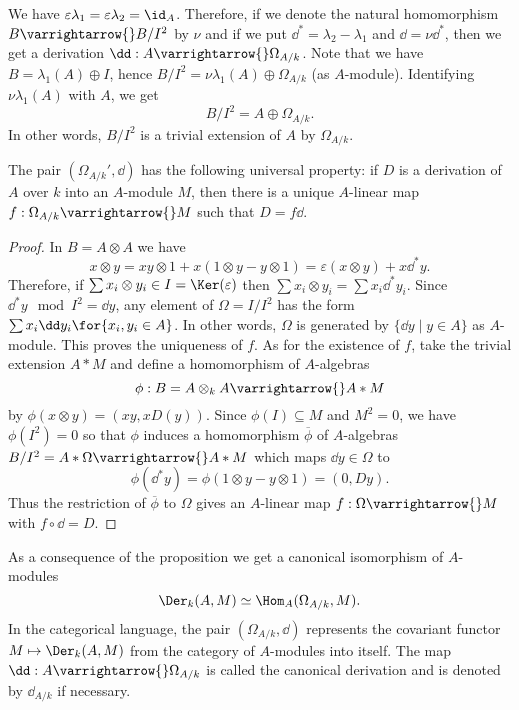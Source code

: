 \documentclass[../main]{subfiles}
\begin{document}
We have $\varepsilon \lambda_1=\varepsilon \lambda_2=\id_A$. Therefore, if we denote the natural homomorphism $B \varrightarrow{} B / I^2$ by $\nu$ and if we put $\dd^\ast=\lambda_2-\lambda_1$ and $\dd=\nu \dd^*$, then we get a derivation $\dd: A \varrightarrow{} \Omega_{A / k}$. Note that we have $B=\lambda_1(A) \oplus I$, hence $B / I^2=\nu \lambda_1(A) \oplus \Omega_{A / k}$ (as $A$-module). Identifying $\nu \lambda_1(A)$ with $A$, we get
\[
B / I^2=A \oplus \Omega_{A/k}.
\]
In other words, $B / I^2$ is a trivial extension of $A$ by $\Omega_{A/k}$.

\begin{proposition}\label{prop:26.01}
The pair $(\Omega_{A/k}', \dd)$ has the following universal property: if $D$ is a derivation of $A$ over $k$ into an $A$-module $M$, then there is a unique $A$-linear map $f: \Omega_{A / k} \varrightarrow{} M$ such that $D=f \dd$.
\end{proposition}
\begin{proof}
In $B=A \otimes A$ we have \[x \otimes y=x y \otimes 1+x(1 \otimes y-y \otimes 1)=\varepsilon(x \otimes y)+x \dd^\ast y.\] Therefore, if $\sum x_i \otimes y_i \in I=\Ker(\varepsilon)$ then $\sum x_i \otimes y_i=\sum x_i \dd^{\ast} y_i$. Since $\dd^\ast y \mod I^2=\dd y$, any element of $\Omega= I/ I^2$ has the form $\sum x_i \dd y_i\for{x_i, y_i\in A}$. In other words, $\Omega$ is generated by $\{\dd y \mid y \in A\}$ as $A$-module. This proves the uniqueness of $f$. As for the existence of $f$, take the trivial extension $A\ast M$ and define a homomorphism of $A$-algebras \[\phi: B=A \otimes_k A \varrightarrow{} A \ast M\] by $\phi(x \otimes y)=(x y, x D(y))$. Since $\phi(I) \subseteq M$ and $M^2=0$, we have $\phi(I^2)=0$ so that $\phi$ induces a homomorphism $\overline{\phi}$ of $A$-algebras $B / I^2=A * \Omega \varrightarrow{} A \ast M$ which maps $\dd y \in \Omega$ to \[\phi(\dd^* y)=\phi(1 \otimes y-y \otimes 1)=(0, D y).\] Thus the restriction of $\overline{\phi}$ to $\Omega$ gives an $A$-linear map \newline $f: \Omega \varrightarrow{} M$ with $f \circ \dd=D$.
\end{proof}

As a consequence of the proposition we get a canonical isomorphism of $A$-modules
\[
\Der_k(A, M) \simeq \Hom_A(\Omega_{A/k}, M) .
\]
In the categorical language, the pair $(\Omega_{A/k}, \dd)$ represents the covariant functor $M \mapsto \Der_k(A, M)$ from the category of $A$-modules into itself. The map \newline $\dd: A \varrightarrow{} \Omega_{A / k}$ is called the canonical derivation and is denoted by $\dd_{A / k}$ if necessary.
\end{document}
